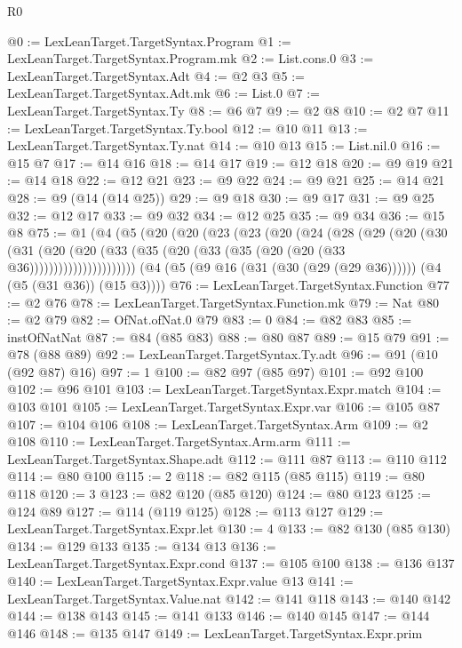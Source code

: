 \begin{lexlean}{R0}
\begin{coremodule}
@0 := LexLeanTarget.TargetSyntax.Program
@1 := LexLeanTarget.TargetSyntax.Program.mk
@2 := List.cons.{0}
@3 := LexLeanTarget.TargetSyntax.Adt
@4 := @2 @3
@5 := LexLeanTarget.TargetSyntax.Adt.mk
@6 := List.{0}
@7 := LexLeanTarget.TargetSyntax.Ty
@8 := @6 @7
@9 := @2 @8
@10 := @2 @7
@11 := LexLeanTarget.TargetSyntax.Ty.bool
@12 := @10 @11
@13 := LexLeanTarget.TargetSyntax.Ty.nat
@14 := @10 @13
@15 := List.nil.{0}
@16 := @15 @7
@17 := @14 @16
@18 := @14 @17
@19 := @12 @18
@20 := @9 @19
@21 := @14 @18
@22 := @12 @21
@23 := @9 @22
@24 := @9 @21
@25 := @14 @21
@28 := @9 (@14 (@14 @25))
@29 := @9 @18
@30 := @9 @17
@31 := @9 @25
@32 := @12 @17
@33 := @9 @32
@34 := @12 @25
@35 := @9 @34
@36 := @15 @8
@75 := @1
    (@4
      (@5
        (@20
          (@20
            (@23
              (@23
                (@20
                  (@24
                    (@28
                      (@29
                        (@20
                          (@30
                            (@31
                              (@20
                                (@20
                                  (@33 (@35 (@20 (@33 (@35 (@20 (@20 (@33 @36))))))))))))))))))))))
      (@4 (@5 (@9 @16 (@31 (@30 (@29 (@29 @36)))))) (@4 (@5 (@31 @36)) (@15 @3))))
@76 := LexLeanTarget.TargetSyntax.Function
@77 := @2 @76
@78 := LexLeanTarget.TargetSyntax.Function.mk
@79 := Nat
@80 := @2 @79
@82 := OfNat.ofNat.{0} @79
@83 := 0
@84 := @82 @83
@85 := instOfNatNat
@87 := @84 (@85 @83)
@88 := @80 @87
@89 := @15 @79
@91 := @78 (@88 @89)
@92 := LexLeanTarget.TargetSyntax.Ty.adt
@96 := @91 (@10 (@92 @87) @16)
@97 := 1
@100 := @82 @97 (@85 @97)
@101 := @92 @100
@102 := @96 @101
@103 := LexLeanTarget.TargetSyntax.Expr.match
@104 := @103 @101
@105 := LexLeanTarget.TargetSyntax.Expr.var
@106 := @105 @87
@107 := @104 @106
@108 := LexLeanTarget.TargetSyntax.Arm
@109 := @2 @108
@110 := LexLeanTarget.TargetSyntax.Arm.arm
@111 := LexLeanTarget.TargetSyntax.Shape.adt
@112 := @111 @87
@113 := @110 @112
@114 := @80 @100
@115 := 2
@118 := @82 @115 (@85 @115)
@119 := @80 @118
@120 := 3
@123 := @82 @120 (@85 @120)
@124 := @80 @123
@125 := @124 @89
@127 := @114 (@119 @125)
@128 := @113 @127
@129 := LexLeanTarget.TargetSyntax.Expr.let
@130 := 4
@133 := @82 @130 (@85 @130)
@134 := @129 @133
@135 := @134 @13
@136 := LexLeanTarget.TargetSyntax.Expr.cond
@137 := @105 @100
@138 := @136 @137
@140 := LexLeanTarget.TargetSyntax.Expr.value @13
@141 := LexLeanTarget.TargetSyntax.Value.nat
@142 := @141 @118
@143 := @140 @142
@144 := @138 @143
@145 := @141 @133
@146 := @140 @145
@147 := @144 @146
@148 := @135 @147
@149 := LexLeanTarget.TargetSyntax.Expr.prim

\end{coremodule}
\end{lexlean}
